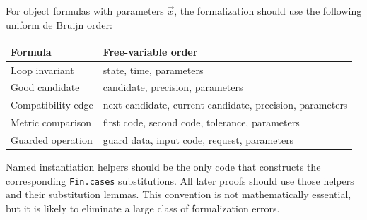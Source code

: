 For object formulas with parameters \(\vec{x}\), the formalization should use the following uniform de Bruijn order:

\begin{center}
\begin{tabular}{@{}ll@{}}
\toprule
Formula & Free-variable order \\
\midrule
Loop invariant & state, time, parameters \\
Good candidate & candidate, precision, parameters \\
Compatibility edge & next candidate, current candidate, precision, parameters \\
Metric comparison & first code, second code, tolerance, parameters \\
Guarded operation & guard data, input code, request, parameters \\
\bottomrule
\end{tabular}
\end{center}

Named instantiation helpers should be the only code that constructs the corresponding \texttt{Fin.cases} substitutions.  All later proofs should use those helpers and their substitution lemmas.  This convention is not mathematically essential, but it is likely to eliminate a large class of formalization errors.
